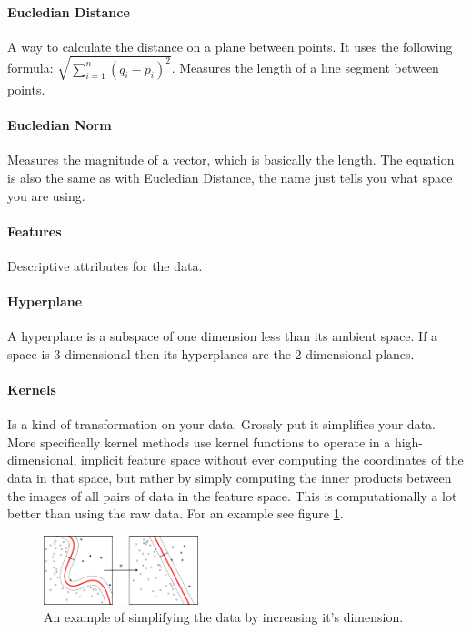 \paragraph{Eucledian Distance}
A way to calculate the distance on a plane between points. It uses the following formula: $\sqrt{\sum\limits_{i=1}^n (q_{i} - p_{i})^2}$. Measures the length of a line segment between points.

\paragraph{Eucledian Norm}
Measures the magnitude of a vector, which is basically the length. The equation is also the same as with Eucledian Distance, the name just tells you what space you are using.

\paragraph{Features} 
Descriptive attributes for the data.

\paragraph{Hyperplane}
A hyperplane is a subspace of one dimension less than its ambient space. If a space is 3-dimensional then its hyperplanes are the 2-dimensional planes.

\paragraph{Kernels} 
Is a kind of transformation on your data. Grossly put it simplifies your data. More specifically kernel methods use kernel functions to operate in a high-dimensional, implicit feature space without ever computing the coordinates of the data in that space, but rather by simply computing the inner products between the images of all pairs of data in the feature space. This is computationally a lot better than using the raw data. For an example see figure \ref{fig:kernelmethods}.
\begin{figure}
\centering
\includegraphics[width=0.4\textwidth]{images/kernelmethod.png}
\caption{\label{fig:kernelmethods} An example of simplifying the data by increasing it's dimension.}
\end{figure}

